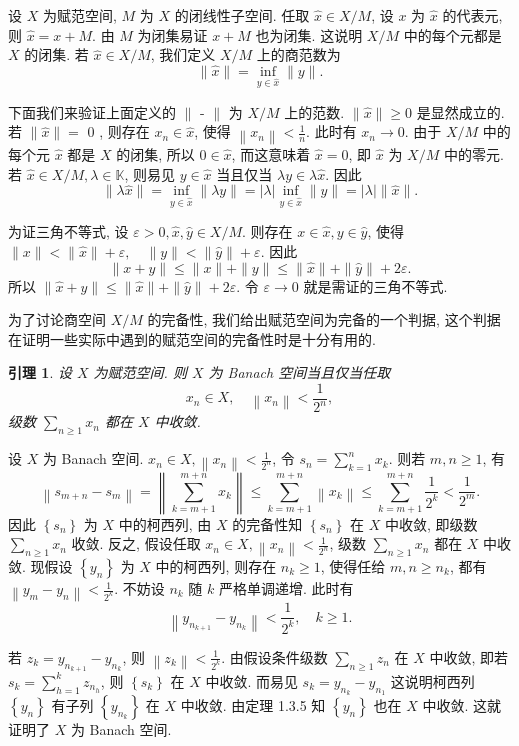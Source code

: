 \documentclass[openany]{ctexbook}
\makeatletter
\theoremstyle{kaiti}
\newtheorem{lemma}{引理}[section]
\theoremstyle{normal}
\renewenvironment{proof}[1][\proofname]{\par
    \pushQED{\qed}%
    \normalfont \topsep6\p@\@plus6\p@\relax
    \trivlist
    \item\relax
    {\heiti #1}\hspace{2\labelsep}\ignorespaces
  }{%
    \popQED\endtrivlist\@endpefalse
  }
\makeatother
\begin{document}
设 $X$ 为赋范空间, $M$ 为 $X$ 的闭线性子空间. 任取 $\hat{x} \in X / M$, 设 $x$ 为 $\hat{x}$ 的代表元, 则 $\hat{x}=x+M$. 由 $M$ 为闭集易证 $x+M$ 也为闭集. 这说明 $X / M$ 中的每个元都是 $X$ 的闭集. 若 $\hat{x} \in X / M$, 我们定义 $X / M$ 上的商范数为
$$
\|\hat{x}\|=\inf_{y \in \hat{x}}\|y\|.
$$

下面我们来验证上面定义的 $\|$ - $\|$ 为 $X / M$ 上的范数. $\|\hat{x}\| \geqslant 0$ 是显然成立的. 若 $\|\hat{x}\|=$ 0 , 则存在 $x_n \in \hat{x}$, 使得 $\left\|x_n\right\|<\frac{1}{n}$. 此时有 $x_n \rightarrow 0$. 由于 $X / M$ 中的每个元 $\hat{x}$ 都是 $X$ 的闭集, 所以 $0 \in \hat{x}$, 而这意味着 $\hat{x}=\hat{0}$, 即 $\hat{x}$ 为 $X / M$ 中的零元. 若 $\hat{x} \in X / M, \lambda \in \mathbb{K}$, 则易见 $y \in \hat{x}$ 当且仅当 $\lambda y \in \lambda \hat{x}$. 因此
$$
\|\lambda \hat{x}\|=\inf_{y \in \hat{x}}\|\lambda y\|=|\lambda| \inf_{y \in \hat{x}}\|y\|=|\lambda|\|\hat{x}\|.
$$

为证三角不等式, 设 $\varepsilon>0, \hat{x}, \hat{y} \in X / M$. 则存在 $x \in \hat{x}, y \in \hat{y}$, 使得
$\|x\|<\|\hat{x}\|+\varepsilon, \quad\|y\|<\|\hat{y}\|+\varepsilon.$
因此
$$
\|x+y\| \leqslant\|x\|+\|y\| \leqslant\|\hat{x}\|+\|\hat{y}\|+2 \varepsilon.
$$
所以 $\|\hat{x}+\hat{y}\| \leqslant\|\hat{x}\|+\|\hat{y}\|+2 \varepsilon$. 令 $\varepsilon \rightarrow 0$ 就是需证的三角不等式.

为了讨论商空间 $X / M$ 的完备性, 我们给出赋范空间为完备的一个判据, 这个判据在证明一些实际中遇到的赋范空间的完备性时是十分有用的.

\begin{lemma}
  设 $X$ 为赋范空间. 则 $X$ 为 Banach 空间当且仅当任取
  $$
  x_n \in X, \quad\left\|x_n\right\|<\frac{1}{2^n},
  $$
  级数 $\sum_{n \geqslant 1} x_n$ 都在 $X$ 中收敛.
\end{lemma}

\begin{proof}
设 $X$ 为 Banach 空间. $x_n \in X,\left\|x_n\right\|<\frac{1}{2^n}$, 令 $s_n=\sum_{k=1}^n x_{k}$. 则若 $m, n \geqslant 1$, 有
$$
\left\|s_{m+n}-s_m\right\|=\left\|\sum_{k=m+1}^{m+n} x_{k}\right\| \leqslant \sum_{k=m+1}^{m+n}\left\|x_{k}\right\| \leqslant \sum_{k=m+1}^{m+n} \frac{1}{2^{k}}<\frac{1}{2^m}.
$$
因此 $\left\{s_n\right\}$ 为 $X$ 中的柯西列, 由 $X$ 的完备性知 $\left\{s_n\right\}$ 在 $X$ 中收敛, 即级数 $\sum_{n \geqslant 1} x_n$ 收敛.
反之, 假设任取 $x_n \in X,\left\|x_n\right\|<\frac{1}{2^n}$, 级数 $\sum_{n \geqslant 1} x_n$ 都在 $X$ 中收敛. 现假设 $\left\{y_n\right\}$ 为 $X$ 中的柯西列, 则存在 $n_{k} \geqslant 1$, 使得任给 $m, n \geqslant n_{k}$, 都有 $\left\|y_m-y_n\right\|<\frac{1}{2^{k}}$. 不妨设 $n_{k}$ 随 $k$ 严格单调递增. 此时有
$$
\left\|y_{n_{k+1}}-y_{n_{k}}\right\|<\frac{1}{2^{k}}, \quad k \geqslant 1.
$$

若 $z_{k}=y_{n_{k+1}}-y_{n_{k}}$, 则 $\left\|z_{k}\right\|<\frac{1}{2^{k}}$. 由假设条件级数 $\sum_{n \geqslant 1} z_n$ 在 $X$ 中收敛, 即若 $s_{k}=\sum_{h=1}^{k} z_{n_{h}}$, 则 $\left\{s_{k}\right\}$ 在 $X$ 中收敛. 而易见 $s_{k}=y_{n_{k}}-y_{n_1}$ 这说明柯西列 $\left\{y_n\right\}$ 有子列 $\left\{y_{n_{k}}\right\}$ 在 $X$ 中收敛. 由定理 1.3.5 知 $\left\{y_n\right\}$ 也在 $X$ 中收敛. 这就证明了 $X$ 为 Banach 空间.
\end{proof}
\end{document}
